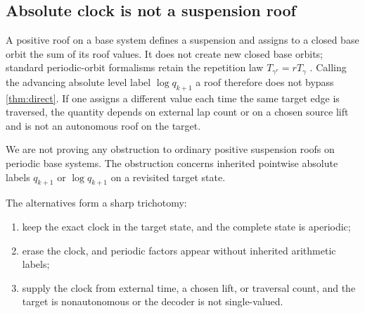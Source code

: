 \subsection{Absolute clock is not a suspension roof}

A positive roof on a base system defines a suspension and assigns to a
closed base orbit the sum of its roof values.  It does not create new closed
base orbits; standard periodic-orbit formalisms retain the repetition law
$T_{\gamma^r}=rT_\gamma$ \citep{parrypollicott1990}.  Calling the advancing
absolute level label $\log q_{k+1}$ a roof therefore does not bypass
\cref{thm:direct}.  If one assigns a different value each time the same
target edge is traversed, the quantity depends on external lap count or on a
chosen source lift and is not an autonomous roof on the target.

We are not proving any obstruction to ordinary positive suspension roofs on
periodic base systems.  The obstruction concerns inherited pointwise
absolute labels $q_{k+1}$ or $\log q_{k+1}$ on a revisited target state.

The alternatives form a sharp trichotomy:
\begin{enumerate}[label=(\arabic*)]
  \item keep the exact clock in the target state, and the complete state is
  aperiodic;
  \item erase the clock, and periodic factors appear without inherited
  arithmetic labels;
  \item supply the clock from external time, a chosen lift, or traversal
  count, and the target is nonautonomous or the decoder is not single-valued.
\end{enumerate}
